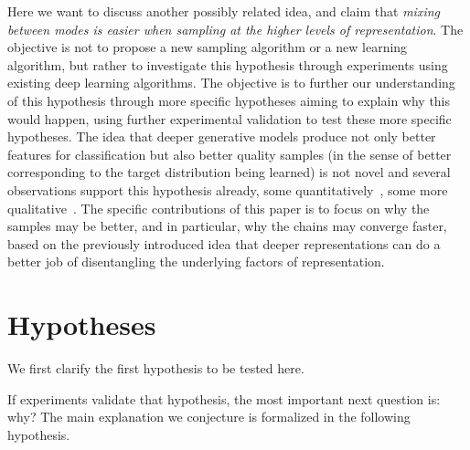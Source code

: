 Here we want to discuss another possibly related idea, and claim that
{\em mixing between modes is easier when sampling at the higher levels of
  representation}.  The objective is not to propose a new sampling
algorithm or a new learning algorithm, but rather to investigate this
hypothesis through experiments using existing deep learning algorithms. The
objective is to further our understanding of this hypothesis through more
specific hypotheses aiming to explain why this would happen, using further
experimental validation to test these more specific hypotheses. The idea
that deeper generative models produce not only better features for
classification but also better quality samples (in the sense of better
corresponding to the target distribution being learned) is not novel and
several observations support this hypothesis
already, some quantitatively~\citep{Salakhutdinov+Hinton-2009}, 
some more qualitative~\citep{Hinton06}. The specific contributions
of this paper is to focus on why the samples may be better, and in
particular, why the chains may converge faster, based on the previously
introduced idea that deeper representations can do a better job
of disentangling the underlying factors of representation.

\section{Hypotheses}

We first clarify the first hypothesis to be tested here.
\begin{center}
\end{center}

If experiments validate that hypothesis, the most important next question is: why?
The main explanation we conjecture is formalized in the following hypothesis.

\begin{center}
\end{center}

